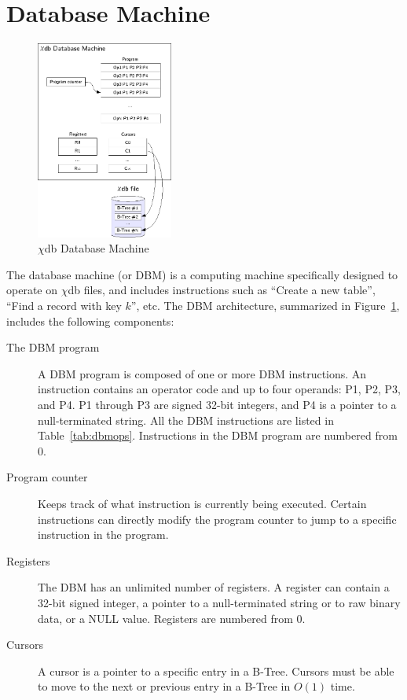 \documentclass[10pt]{article}
\newcommand{\chidb}{$\chi$\textsf{db}}
\begin{document}
\section{Database Machine}
\label{sec:dbm}

\begin{figure}
\begin{center}
\includegraphics[width=0.4\textwidth]{images/dbm.png}
\caption{\chidb{} Database Machine}
\end{center}
\label{fig:dbm}
\end{figure}

The database machine (or DBM) is a computing machine specifically designed to operate on \chidb{} files, and includes instructions such as ``Create a new table'', ``Find a record with key $k$'', etc. The DBM architecture, summarized in Figure~\ref{fig:dbm}, includes the following components:

\begin{description}
\item[The DBM program] A DBM program is composed of one or more DBM instructions. An instruction contains an operator code and up to four operands: P1, P2, P3, and P4. P1 through P3 are signed 32-bit integers, and P4 is a pointer to a null-terminated string. All the DBM instructions are listed in Table~\ref{tab:dbmops}. Instructions in the DBM program are numbered from 0.
\item[Program counter] Keeps track of what instruction is currently being executed. Certain instructions can directly modify the program counter to jump to a specific instruction in the program.
\item[Registers] The DBM has an unlimited number of registers. A register can contain a 32-bit signed integer, a pointer to a null-terminated string or to raw binary data, or a NULL value. Registers are numbered from 0.
\item[Cursors] A cursor is a pointer to a specific entry in a B-Tree. Cursors must be able to move to the next or previous entry in a B-Tree in $O(1)$ time.
\end{description}
\end{document}
